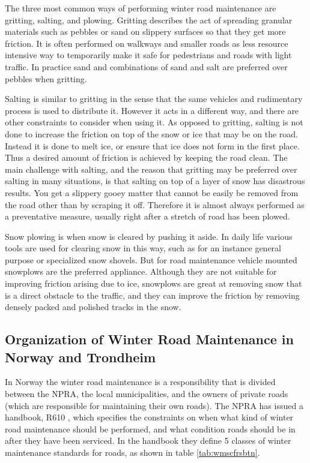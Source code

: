 The three most common ways of performing winter road maintenance are gritting, salting, and plowing. Gritting describes the act of spreading granular materials such as pebbles or sand on slippery surfaces so that they get more friction. It is often performed on walkways and smaller roads as less resource intensive way to temporarily make it safe for pedestrians and roads with light traffic. In practice sand and combinations of sand and salt are preferred over pebbles when gritting.

Salting is similar to gritting in the sense that the same vehicles and rudimentary process is used to distribute it. However it acts in a different way, and there are other constraints to consider when using it. As opposed to gritting, salting is not done to increase the friction on top of the snow or ice that may be on the road. Instead it is done to melt ice, or ensure that ice does not form in the first place. Thus a desired amount of friction is achieved by keeping the road clean. The main challenge with salting, and the reason that gritting may be preferred over salting in many situations, is that salting on top of a layer of snow has disastrous results. You get a slippery gooey matter that cannot be easily be removed from the road other than by scraping it off. Therefore it is almost always performed as a preventative measure, usually right after a stretch of road has been plowed.

Snow plowing is when snow is cleared by pushing it aside. In daily life various tools are used for clearing snow in this way, such as for an instance general purpose or specialized snow shovels. But for road maintenance vehicle mounted snowplows are the preferred appliance. Although they are not suitable for improving friction arising due to ice, snowplows are great at removing snow that is a direct obstacle to the traffic, and they can improve the friction  by removing densely packed and polished tracks in the snow.

\subsection{Organization of Winter Road Maintenance in Norway and Trondheim} %
\label{ssub:how_winter_road_maintenance_is_organized_in_norway_and_trondheim}


In Norway the winter road maintenance is a responsibility that is divided between the NPRA, the local municipalities, and the owners of private roads (which are responsible for maintaining their own roads). The NPRA has issued a handbook, R610 \citep{svvR610}, which specifies the constraints on when what kind of winter road maintenance should be performed, and what condition roads should be in after they have been serviced. In the handbook they define 5 classes of winter maintenance standards for roads, as shown in table \ref{tab:wmscfrsbtn}.

